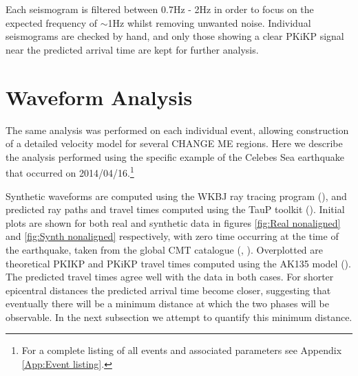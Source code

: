 \documentclass[11pt,a4paper]{article}
\begin{document}
Each seismogram is filtered between 0.7Hz - 2Hz in order to focus on the expected frequency of $\sim$1Hz whilst removing unwanted noise. Individual seismograms are checked by hand, and only those showing a clear PKiKP signal near the predicted arrival time are kept for further analysis.

\section{Waveform Analysis}
\label{sec:Waveforms}
The same analysis was performed on each individual event, allowing construction of a detailed velocity model for several CHANGE ME regions. Here we describe the analysis performed using the specific example of the Celebes Sea earthquake that occurred on 2014/04/16.\footnote{For a complete listing of all events and associated parameters see Appendix \ref{App:Event listing}.}

Synthetic waveforms are computed using the WKBJ ray tracing program (\cite{Chapman1976}), and predicted ray paths and travel times computed using the TauP toolkit (\cite{Crotwell1999}). Initial plots are shown for both real and synthetic data in figures \ref{fig:Real nonaligned} and \ref{fig:Synth nonaligned} respectively, with zero time occurring at the time of the earthquake, taken from the global CMT catalogue (\cite{Dziewonski1981}, \cite{Alboussiere2012}). Overplotted are theoretical PKIKP and PKiKP travel times computed using the AK135 model (\cite{Kennett1995b}). The predicted travel times agree well with the data in both cases. For shorter epicentral distances the predicted arrival time become closer, suggesting that eventually there will be a minimum distance at which the two phases will be observable. In the next subsection we attempt to quantify this minimum distance.
\end{document}
